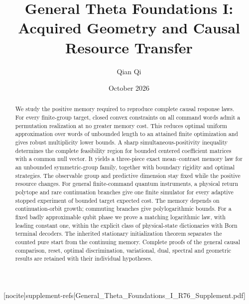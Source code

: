 
[nocite]{supplement-refs}[General_Theta_Foundations_I_R76_Supplement.pdf]
\title[Acquired geometry and causal resource transfer]{General Theta Foundations I:\\Acquired Geometry and Causal Resource Transfer}
\author{Qian Qi}\date{October 2026}

\begin{abstract}
We study the positive memory required to reproduce complete causal response laws.
For every finite-group target, closed convex constraints on all command
words admit a permutation realization at no greater memory cost. This
reduces optimal uniform approximation over words of unbounded length to
an attained finite optimization and gives robust multiplicity lower bounds.
A sharp simultaneous-positivity inequality determines the complete
feasibility region for bounded centered coefficient matrices with a
common null vector. It yields a three-piece exact mean--contrast memory
law for an unbounded symmetric-group family, together with boundary
rigidity and optimal strategies. The observable group and predictive
dimension stay fixed while the positive resource changes.
For general finite-command quantum instruments, a physical return polytope
and rare continuation branches give one finite simulator for every
adaptive stopped experiment of bounded target expected cost.
The memory depends on continuation-orbit growth; commuting branches give
polylogarithmic bounds. For a fixed badly approximable qubit phase we
prove a matching logarithmic law, with leading constant one, within the
explicit class of physical-state dictionaries with Born terminal decoders.
The inherited stationary initialization theorem separates the counted
pure start from the continuing memory. Complete proofs of the general
causal comparison, reset, optimal discrimination, variational, dual,
spectral and geometric results are retained with their individual hypotheses.
\end{abstract}
\maketitle











